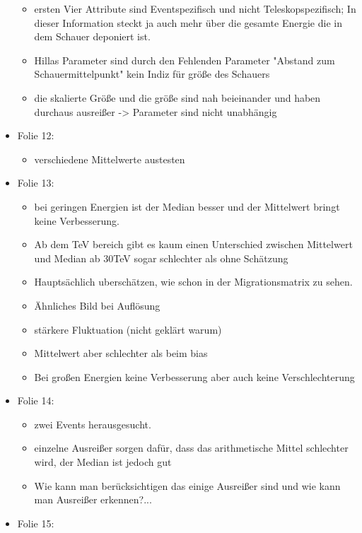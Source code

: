 \documentclass[
  bibliography=totoc,     %
  captions=tableheading,  %
  titlepage=firstiscover, %
]{scrartcl}
\begin{document}
\begin{itemize}
      \begin{itemize}
        \item ersten Vier Attribute sind Eventspezifisch und nicht Teleskopspezifisch; In dieser Information steckt ja auch mehr über die gesamte
        Energie die in dem Schauer deponiert ist.
        \item Hillas Parameter sind durch den Fehlenden Parameter "Abstand zum Schauermittelpunkt" kein Indiz für größe des Schauers
        \item die skalierte Größe und die größe sind nah beieinander und haben durchaus ausreißer -> Parameter sind nicht unabhängig
      \end{itemize}
    \item Folie 12:
      \begin{itemize}
        \item verschiedene Mittelwerte austesten
      \end{itemize}
    \item Folie 13:
      \begin{itemize}
        \item bei geringen Energien ist der Median besser und der Mittelwert bringt keine Verbesserung.
        \item Ab dem TeV bereich gibt es kaum einen Unterschied zwischen Mittelwert und Median ab 30TeV sogar schlechter als ohne Schätzung
        \item Hauptsächlich uberschätzen, wie schon in der Migrationsmatrix zu sehen.
        \item Ähnliches Bild bei Auflösung
        \item stärkere Fluktuation (nicht geklärt warum)
        \item Mittelwert aber schlechter als beim bias
        \item Bei großen Energien keine Verbesserung aber auch keine Verschlechterung
      \end{itemize}
    \item Folie 14:
      \begin{itemize}
        \item zwei Events herausgesucht.
        \item einzelne Ausreißer  sorgen dafür, dass das arithmetische Mittel schlechter wird, der Median ist jedoch gut
        \item Wie kann man berücksichtigen das einige Ausreißer sind und wie kann man Ausreißer erkennen?...
      \end{itemize}
    \item Folie 15:

\end{itemize}
\end{document}
